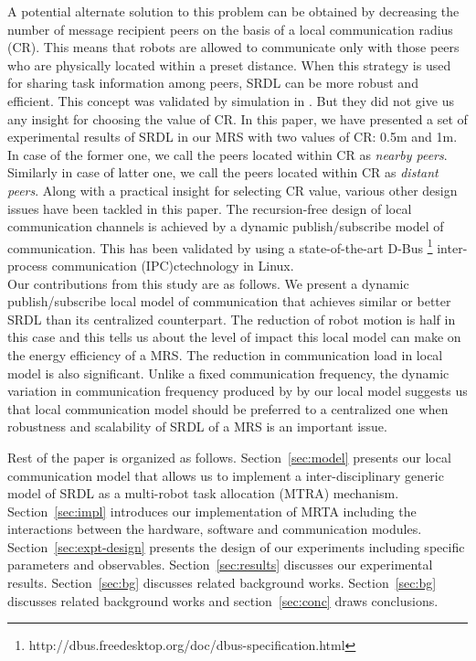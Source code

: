 \documentclass[letterpaper, 10 pt, conference]{ieeeconf}  %
\begin{document}
A potential alternate solution to this problem can be obtained by decreasing the number of message recipient peers on the basis of a local communication radius (CR). This means that robots are allowed to communicate only with those peers who are physically located within a preset distance. When this strategy is used for sharing task information among peers, SRDL can be more robust and efficient. This concept was validated by simulation in \cite{Agassounon}. But they did not give us any insight for choosing the value of CR. In this paper, we have presented a set of experimental results of SRDL in our MRS with two values of CR: 0.5m and 1m. In case of the former one, we call the peers located within CR as {\em nearby peers}. Similarly in case of latter one, we call the peers located within CR as {\em distant peers}. Along with a practical insight for selecting CR value, various other design issues have been tackled in this paper. The recursion-free design of  local communication channels is achieved by a dynamic publish/subscribe model of communication. This has been validated by using a state-of-the-art D-Bus \footnote{http://dbus.freedesktop.org/doc/dbus-specification.html} inter-process communication (IPC)ctechnology in Linux.\\
Our contributions from this study are as follows. We present a dynamic publish/subscribe local model of communication that achieves similar or better SRDL than its centralized counterpart. The reduction of robot motion is half in this case and this tells us about the level of impact this local model can make on the energy efficiency of a MRS. The reduction in communication load in local model  is also significant.  Unlike a fixed communication frequency, the dynamic variation in communication frequency produced by by our local model suggests us that local communication model should be preferred to a centralized one when robustness and scalability of SRDL of a MRS is an important issue.

Rest of the paper is organized as follows.  Section~\ref{sec:model} presents our local communication model that allows us to implement a inter-disciplinary generic model of SRDL as a multi-robot task allocation (MTRA) mechanism. Section~\ref{sec:impl} introduces our implementation of MRTA including the interactions between the hardware, software and communication modules. Section~\ref{sec:expt-design} presents the design of our experiments including specific parameters and observables. Section~\ref{sec:results} discusses our experimental results. Section~\ref{sec:bg} discusses related background works. Section~\ref{sec:bg} discusses related background works and section~\ref{sec:conc} draws conclusions.
%
\end{document}
